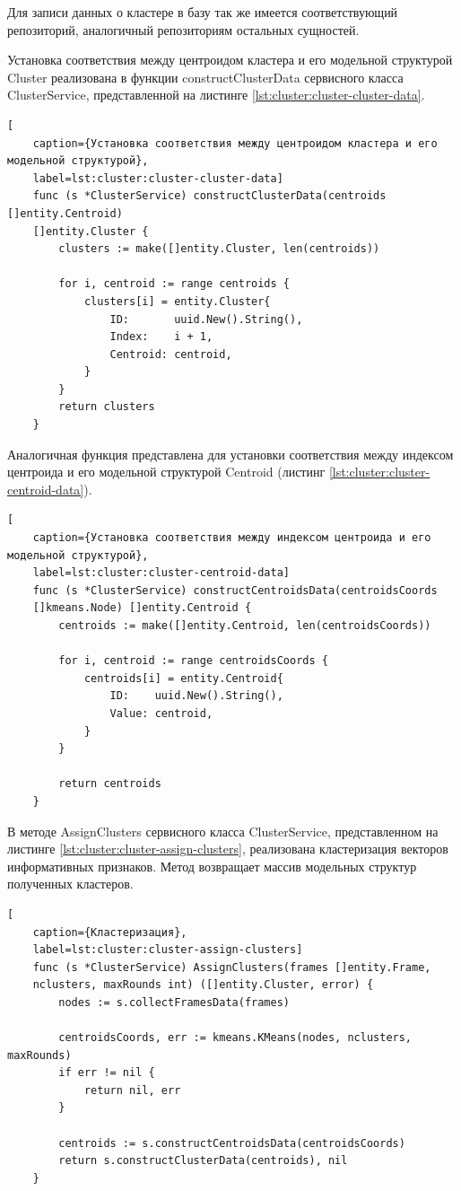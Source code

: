 Для записи данных о кластере в базу так же имеется соответствующий репозиторий, аналогичный репозиториям остальных сущностей. 

Установка соответствия между центроидом кластера и его модельной структурой Cluster реализована в функции constructClusterData сервисного класса ClusterService, представленной на листинге \ref{lst:cluster:cluster-cluster-data}.
\begin{lstlisting}[
	caption={Установка соответствия между центроидом кластера и его модельной структурой},
	label=lst:cluster:cluster-cluster-data]
	func (s *ClusterService) constructClusterData(centroids []entity.Centroid) 
	[]entity.Cluster {
		clusters := make([]entity.Cluster, len(centroids))
		
		for i, centroid := range centroids {
			clusters[i] = entity.Cluster{
				ID:       uuid.New().String(),
				Index:    i + 1,
				Centroid: centroid,
			}
		}
		return clusters
	}
\end{lstlisting}
Аналогичная функция представлена для установки соответствия между индексом центроида и его модельной структурой Centroid (листинг \ref{lst:cluster:cluster-centroid-data}).
\begin{lstlisting}[
	caption={Установка соответствия между индексом центроида и его модельной структурой},
	label=lst:cluster:cluster-centroid-data]
	func (s *ClusterService) constructCentroidsData(centroidsCoords
	[]kmeans.Node) []entity.Centroid {
		centroids := make([]entity.Centroid, len(centroidsCoords))
		
		for i, centroid := range centroidsCoords {
			centroids[i] = entity.Centroid{
				ID:    uuid.New().String(),
				Value: centroid,
			}
		}
		
		return centroids
	}
\end{lstlisting}
В методе AssignClusters сервисного класса ClusterService, представленном на листинге \ref{lst:cluster:cluster-assign-clusters}, реализована кластеризация векторов информативных признаков. Метод возвращает массив модельных структур полученных кластеров.
\begin{lstlisting}[
	caption={Кластеризация},
	label=lst:cluster:cluster-assign-clusters]
	func (s *ClusterService) AssignClusters(frames []entity.Frame, 
	nclusters, maxRounds int) ([]entity.Cluster, error) {
		nodes := s.collectFramesData(frames)
		
		centroidsCoords, err := kmeans.KMeans(nodes, nclusters, maxRounds)
		if err != nil {
			return nil, err
		}
		
		centroids := s.constructCentroidsData(centroidsCoords)
		return s.constructClusterData(centroids), nil
	}
\end{lstlisting}

